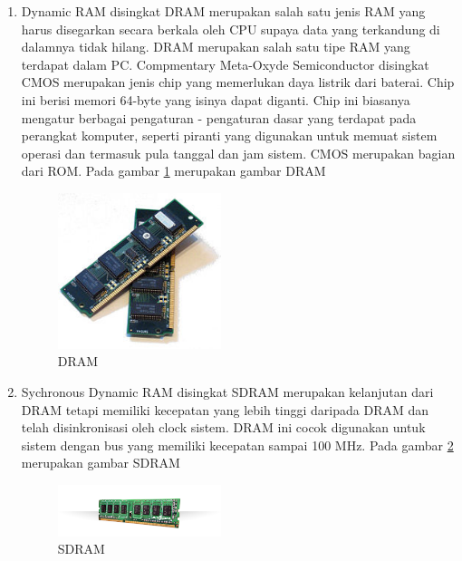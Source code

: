 \begin{enumerate}
\item Dynamic RAM disingkat DRAM merupakan salah satu jenis RAM yang harus disegarkan secara berkala oleh CPU supaya data yang terkandung di dalamnya tidak hilang. DRAM merupakan salah satu tipe RAM yang terdapat dalam PC.
Compmentary Meta-Oxyde Semiconductor disingkat CMOS merupakan jenis chip yang memerlukan daya listrik dari baterai. Chip ini berisi memori 64-byte yang isinya dapat diganti. Chip ini biasanya mengatur berbagai pengaturan - pengaturan dasar yang terdapat 
pada perangkat komputer, seperti piranti yang digunakan untuk memuat sistem operasi dan termasuk pula tanggal dan jam sistem. CMOS merupakan bagian dari ROM. Pada gambar \ref{labelgambar1} merupakan gambar DRAM 
\begin{figure}[htbp]
\centering
\includegraphics[width=0.45\textwidth]{figures/image/DRAM.jpg}
\caption{DRAM}
\label{labelgambar1}
\end{figure}

\item Sychronous Dynamic RAM disingkat SDRAM merupakan kelanjutan dari DRAM tetapi memiliki kecepatan yang lebih tinggi daripada DRAM dan telah disinkronisasi oleh clock sistem. DRAM ini cocok digunakan untuk sistem dengan bus yang memiliki kecepatan sampai 100 MHz. Pada gambar \ref{labelgambar2} merupakan gambar SDRAM
\begin{figure}[htbp]
\centering
\includegraphics[width=0.45\textwidth]{figures/image/sdram.jpg}
\caption{SDRAM}
\label{labelgambar2}
\end{figure}


\end{enumerate}
